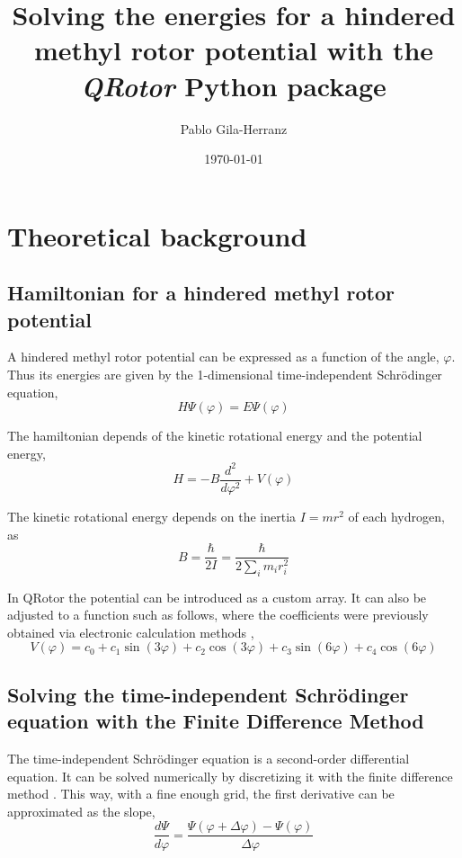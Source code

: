 \documentclass[12pt,a4paper]{article}
\title{Solving the energies for a hindered methyl rotor potential with the \textit{QRotor} Python package}
\author{Pablo Gila-Herranz}
\date{\today}
\begin{document}
\maketitle
\tableofcontents
\thispagestyle{empty} %
\newpage
\setcounter{page}{1} %


\section{Theoretical background}


\subsection{Hamiltonian for a hindered methyl rotor potential}


A hindered methyl rotor potential can be expressed as a function of the angle, $\varphi$. Thus its energies are given by the 1-dimensional time-independent Schrödinger equation,
$$
H\Psi(\varphi)=E\Psi(\varphi)
$$

The hamiltonian depends of the kinetic rotational energy and the potential energy,
\begin{equation} \label{hamiltonian}
H = -B \frac{d^2}{d\varphi^2} + V(\varphi)
\end{equation}

The kinetic rotational energy depends on the inertia $I=mr^2$ of each hydrogen, as
\begin{equation} \label{b}
B = \frac{\hbar}{2I}=\frac{\hbar}{2\sum_{i}m_{i}r_{i}^{2}}
\end{equation}

In QRotor the potential can be introduced as a custom array. It can also be adjusted to a function such as follows, where the coefficients were previously obtained via electronic calculation methods \cite{titov2023},
$$
V(\varphi)=c_{0}+c_{1}\sin(3\varphi)+c_{2}\cos(3\varphi)+c_{3}\sin(6\varphi)+c_{4}\cos(6\varphi)
$$


\subsection{Solving the time-independent Schrödinger equation with the Finite Difference Method}


The time-independent Schrödinger equation is a second-order differential equation.
It can be solved numerically by discretizing it with the finite difference method \cite{finite_diff_python}.
This way, with a fine enough grid, the first derivative can be approximated as the slope,
$$
\frac{d\Psi}{d\varphi} = \frac{\Psi(\varphi+\Delta\varphi)-\Psi(\varphi)}{\Delta\varphi}
$$
\end{document}
